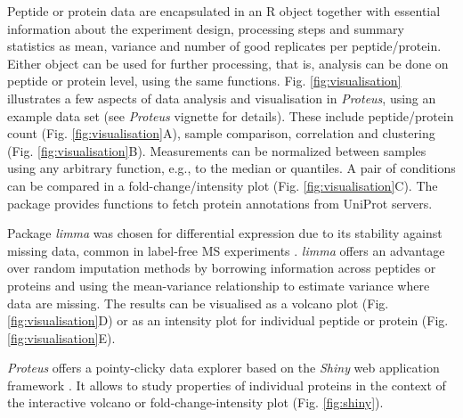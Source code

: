 \documentclass[]{article}
\begin{document}
Peptide or protein data are encapsulated in an R object together with
essential information about the experiment design, processing steps and
summary statistics as mean, variance and number of good replicates per
peptide/protein. Either object can be used for further processing, that
is, analysis can be done on peptide or protein level, using the same
functions. Fig. \ref{fig:visualisation} illustrates a few aspects of
data analysis and visualisation in \emph{Proteus}, using an example data
set (see \emph{Proteus} vignette for details). These include
peptide/protein count (Fig. \ref{fig:visualisation}A), sample
comparison, correlation and clustering (Fig. \ref{fig:visualisation}B).
Measurements can be normalized between samples using any arbitrary
function, e.g., to the median or quantiles. A pair of conditions can be
compared in a fold-change/intensity plot (Fig.
\ref{fig:visualisation}C). The package provides functions to fetch
protein annotations from UniProt servers.

Package \emph{limma} was chosen for differential expression due to its
stability against missing data, common in label-free MS experiments
\citep{lazar2016}. \emph{limma} offers an advantage over random
imputation methods by borrowing information across peptides or proteins
and using the mean-variance relationship to estimate variance where data
are missing. The results can be visualised as a volcano plot (Fig.
\ref{fig:visualisation}D) or as an intensity plot for individual peptide
or protein (Fig. \ref{fig:visualisation}E).

\emph{Proteus} offers a pointy-clicky data explorer based on the
\emph{Shiny} web application framework \citep{shiny}. It allows to study
properties of individual proteins in the context of the interactive
volcano or fold-change-intensity plot (Fig. \ref{fig:shiny}).
\end{document}
